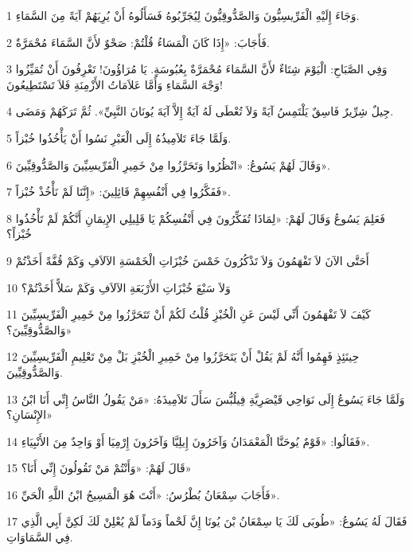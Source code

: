 \par 1 وَجَاءَ إِلَيْهِ الْفَرِّيسِيُّونَ وَالصَّدُّوقِيُّونَ لِيُجَرِّبُوهُ فَسَأَلُوهُ أَنْ يُرِيَهُمْ آيَةً مِنَ السَّمَاءِ.
\par 2 فَأَجَابَ: «إِذَا كَانَ الْمَسَاءُ قُلْتُمْ: صَحْوٌ لأَنَّ السَّمَاءَ مُحْمَرَّةٌ.
\par 3 وَفِي الصَّبَاحِ: الْيَوْمَ شِتَاءٌ لأَنَّ السَّمَاءَ مُحْمَرَّةٌ بِعُبُوسَةٍ. يَا مُرَاؤُونَ! تَعْرِفُونَ أَنْ تُمَيِّزُوا وَجْهَ السَّمَاءِ وَأَمَّا عَلاَمَاتُ الأَزْمِنَةِ فَلاَ تَسْتَطِيعُونَ!
\par 4 جِيلٌ شِرِّيرٌ فَاسِقٌ يَلْتَمِسُ آيَةً وَلاَ تُعْطَى لَهُ آيَةٌ إِلاَّ آيَةَ يُونَانَ النَّبِيِّ». ثُمَّ تَرَكَهُمْ وَمَضَى.
\par 5 وَلَمَّا جَاءَ تَلاَمِيذُهُ إِلَى الْعَبْرِ نَسُوا أَنْ يَأْخُذُوا خُبْزاً.
\par 6 وَقَالَ لَهُمْ يَسُوعُ: «انْظُرُوا وَتَحَرَّزُوا مِنْ خَمِيرِ الْفَرِّيسِيِّينَ وَالصَّدُّوقِيِّينَ».
\par 7 فَفَكَّرُوا فِي أَنْفُسِهِمْ قَائِلِينَ: «إِنَّنَا لَمْ نَأْخُذْ خُبْزاً».
\par 8 فَعَلِمَ يَسُوعُ وَقَالَ لَهُمْ: «لِمَاذَا تُفَكِّرُونَ فِي أَنْفُسِكُمْ يَا قَلِيلِي الإِيمَانِ أَنَّكُمْ لَمْ تَأْخُذُوا خُبْزاً؟
\par 9 أَحَتَّى الآنَ لاَ تَفْهَمُونَ وَلاَ تَذْكُرُونَ خَمْسَ خُبْزَاتِ الْخَمْسَةِ الآلاَفِ وَكَمْ قُفَّةً أَخَذْتُمْ
\par 10 وَلاَ سَبْعَ خُبْزَاتِ الأَرْبَعَةِ الآلاَفِ وَكَمْ سَلاًّ أَخَذْتُمْ؟
\par 11 كَيْفَ لاَ تَفْهَمُونَ أَنِّي لَيْسَ عَنِ الْخُبْزِ قُلْتُ لَكُمْ أَنْ تَتَحَرَّزُوا مِنْ خَمِيرِ الْفَرِّيسِيِّينَ وَالصَّدُّوقِيِّينَ؟»
\par 12 حِينَئِذٍ فَهِمُوا أَنَّهُ لَمْ يَقُلْ أَنْ يَتَحَرَّزُوا مِنْ خَمِيرِ الْخُبْزِ بَلْ مِنْ تَعْلِيمِ الْفَرِّيسِيِّينَ وَالصَّدُّوقِيِّينَ.
\par 13 وَلَمَّا جَاءَ يَسُوعُ إِلَى نَوَاحِي قَيْصَرِيَّةِ فِيلُبُّسَ سَأَلَ تَلاَمِيذَهُ: «مَنْ يَقُولُ النَّاسُ إِنِّي أَنَا ابْنُ الإِنْسَانِ؟»
\par 14 فَقَالُوا: «قَوْمٌ يُوحَنَّا الْمَعْمَدَانُ وَآخَرُونَ إِيلِيَّا وَآخَرُونَ إِرْمِيَا أَوْ وَاحِدٌ مِنَ الأَنْبِيَاءِ».
\par 15 قَالَ لَهُمْ: «وَأَنْتُمْ مَنْ تَقُولُونَ إِنِّي أَنَا؟»
\par 16 فَأَجَابَ سِمْعَانُ بُطْرُسُ: «أَنْتَ هُوَ الْمَسِيحُ ابْنُ اللَّهِ الْحَيِّ».
\par 17 فَقَالَ لَهُ يَسُوعُ: «طُوبَى لَكَ يَا سِمْعَانُ بْنَ يُونَا إِنَّ لَحْماً وَدَماً لَمْ يُعْلِنْ لَكَ لَكِنَّ أَبِي الَّذِي فِي السَّمَاوَاتِ.
